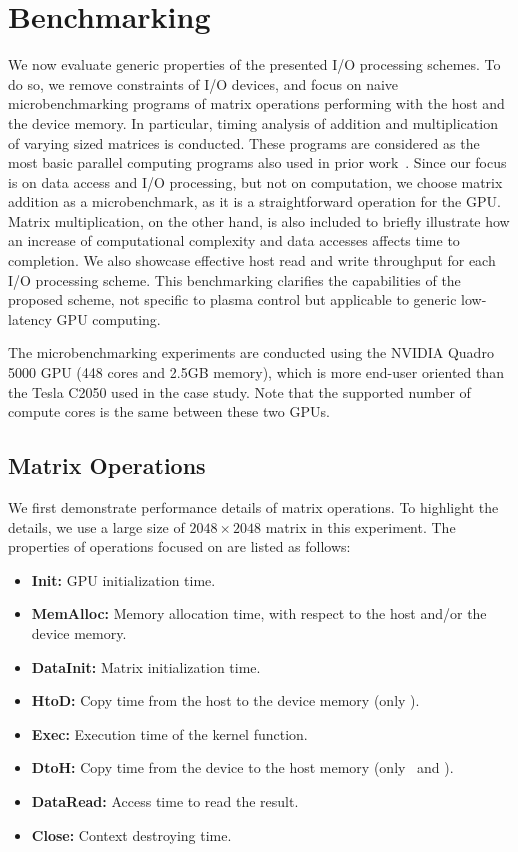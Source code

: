 \section{Benchmarking}
\label{sec:benchmarking}

We now evaluate generic properties of the presented I/O processing
schemes.
To do so, we remove constraints of I/O devices, and focus on naive
microbenchmarking programs of matrix operations performing with the host
and the device memory.
In particular, timing analysis of addition and multiplication of varying
sized matrices is conducted.
These programs are considered as the most basic parallel computing
programs also used in prior work~\cite{Rossbach_SOSP11}.
Since our focus is on data access and I/O processing, but not on
computation, we choose matrix addition as a microbenchmark, as it is 
a straightforward operation for the GPU.
Matrix multiplication, on the other hand, is also included to briefly
illustrate how an increase of computational complexity and data accesses
affects time to completion.
We also showcase effective host read and write throughput for each I/O
processing scheme.
This benchmarking clarifies the capabilities of the proposed scheme, not
specific to plasma control but applicable to generic low-latency
GPU computing.

The microbenchmarking experiments are conducted using the NVIDIA Quadro
5000 GPU (448 cores and 2.5GB memory), which is more end-user oriented
than the Tesla C2050 used in the case study.
Note that the supported number of compute cores is the same between
these two GPUs.

\subsection{Matrix Operations}
\label{sec:matrix}

We first demonstrate performance details of matrix operations.
To highlight the details, we use a large size of $2048\times2048$ matrix
in this experiment.
The properties of operations focused on are listed as follows:

\begin{itemize} \itemsep1pt
 \item {\bf Init:} GPU initialization time.
 \item {\bf MemAlloc:} Memory allocation time, with respect to the host
       and/or the device memory.
 \item {\bf DataInit:} Matrix initialization time.
 \item {\bf HtoD:} Copy time from the host to the device memory (only \hd).
 \item {\bf Exec:} Execution time of the kernel function.
 \item {\bf DtoH:} Copy time from the device to the host memory (only
       \hd\ and \dmh).
 \item {\bf DataRead:} Access time to read the result.
 \item {\bf Close:} Context destroying time.
\end{itemize}

